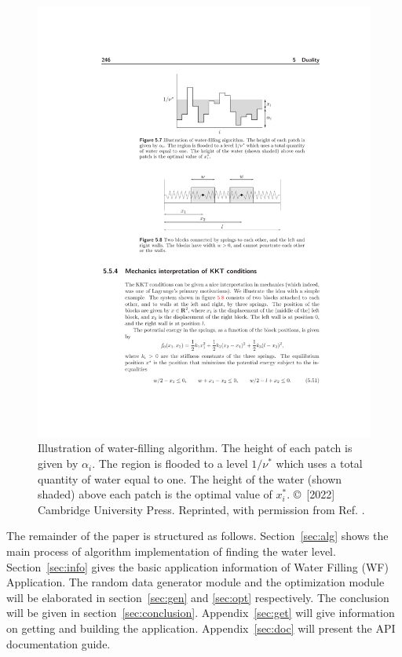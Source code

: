 \documentclass[journal,twoside]{IEEEtran}
\begin{document}
    \begin{figure}[htbp]
      \centering
      \includegraphics[width=.8\linewidth]{fig/cvbook_illu.pdf}
      \caption{Illustration of water-filling algorithm. The height of each patch is
      given by $\alpha_i$. The region is flooded to a level $1/\nu^*$ which uses a total quantity
      of water equal to one. The height of the water (shown shaded) above each
      patch is the optimal value of $x^*_i$.
      \copyright~[2022] Cambridge University Press. Reprinted, with permission from Ref. \cite{boyd2004convex}.}
      \label{fig:cvbook_illu}
    \end{figure}

    The remainder of the paper is structured as follows.
    Section~\ref{sec:alg} shows the main process of algorithm implementation of finding the water level.
    Section~\ref{sec:info} gives the basic application information of Water Filling (WF) Application.
    The random data generator module and the optimization module will be elaborated in section~\ref{sec:gen} and \ref{sec:opt} respectively.
    The conclusion will be given in section~\ref{sec:conclusion}.
    Appendix~\ref{sec:get} will give information on getting and building the application.
    Appendix~\ref{sec:doc} will present the API documentation guide. 
\end{document}
